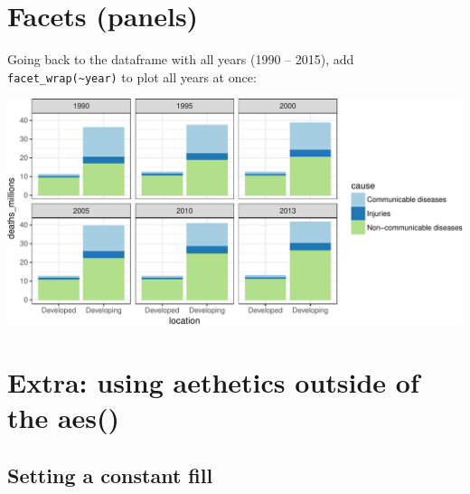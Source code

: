 \documentclass[12pt,]{krantz}
\makeatletter
\newenvironment{Shaded}{\begin{snugshade}}{\end{snugshade}}
\newcommand{\DataTypeTok}[1]{\textcolor[rgb]{0.13,0.29,0.53}{#1}}
\newcommand{\KeywordTok}[1]{\textcolor[rgb]{0.13,0.29,0.53}{\textbf{#1}}}
\newcommand{\NormalTok}[1]{#1}
\newcommand{\OperatorTok}[1]{\textcolor[rgb]{0.81,0.36,0.00}{\textbf{#1}}}
\newcommand{\StringTok}[1]{\textcolor[rgb]{0.31,0.60,0.02}{#1}}
\newenvironment{kframe}{%
\medskip{}
\setlength{\fboxsep}{.8em}
 \def\at@end@of@kframe{}%
 \ifinner\ifhmode%
  \def\at@end@of@kframe{\end{minipage}}%
  \begin{minipage}{\columnwidth}%
 \fi\fi%
 \def\FrameCommand##1{\hskip\@totalleftmargin \hskip-\fboxsep
 \colorbox{shadecolor}{##1}\hskip-\fboxsep
     \hskip-\linewidth \hskip-\@totalleftmargin \hskip\columnwidth}%
 \MakeFramed {\advance\hsize-\width
   \@totalleftmargin\z@ \linewidth\hsize
   \@setminipage}}%
 {\par\unskip\endMakeFramed%
 \at@end@of@kframe}
\renewenvironment{Shaded}{\begin{kframe}}{\end{kframe}}
\theoremstyle{definition}
\theoremstyle{definition}
\theoremstyle{definition}
\theoremstyle{remark}
\makeatother
\begin{document}
\hypertarget{facets-panels}{%
\section{Facets (panels)}\label{facets-panels}}

Going back to the dataframe with all years (1990 -- 2015), add
\texttt{facet\_wrap(\textasciitilde{}year)} to plot all years at once:

\begin{Shaded}
\end{Shaded}

\includegraphics{01_first_interaction_files/figure-latex/unnamed-chunk-6-1.pdf}

\hypertarget{extra-using-aethetics-outside-of-the-aes}{%
\section{Extra: using aethetics outside of the
aes()}\label{extra-using-aethetics-outside-of-the-aes}}

\hypertarget{setting-a-constant-fill}{%
\subsection{Setting a constant fill}\label{setting-a-constant-fill}}
\end{document}
